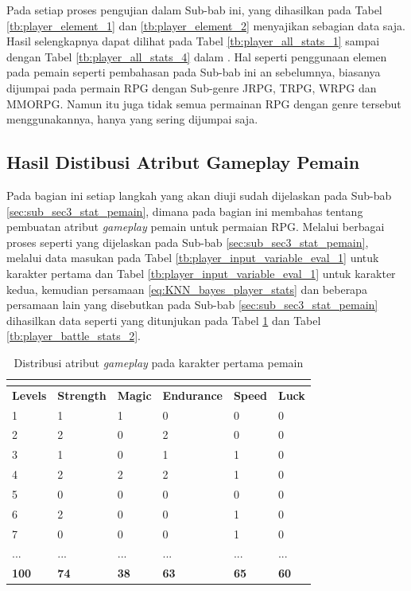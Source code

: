 Pada setiap proses pengujian dalam Sub-bab ini, yang dihasilkan pada Tabel \ref{tb:player_element_1} dan \ref{tb:player_element_2} menyajikan sebagian data saja. Hasil selengkapnya dapat dilihat pada Tabel \ref{tb:player_all_stats_1} sampai dengan Tabel \ref{tb:player_all_stats_4} dalam . Hal seperti penggunaan elemen pada pemain seperti pembahasan pada Sub-bab ini an sebelumnya, biasanya dijumpai pada permain RPG dengan Sub-genre JRPG, TRPG, WRPG dan MMORPG. Namun itu juga tidak semua permainan RPG dengan genre tersebut menggunakannya, hanya yang sering dijumpai saja.
\vspace{1ex}

\subsection{Hasil Distibusi Atribut Gameplay Pemain}
\label{sec:sub_sec4_eval_multi-character_stats}
\vspace{1ex}

Pada bagian ini setiap langkah yang akan diuji sudah dijelaskan pada Sub-bab \ref{sec:sub_sec3_stat_pemain}, dimana pada bagian ini membahas tentang pembuatan atribut \textit{gameplay} pemain untuk permaian RPG. Melalui berbagai proses seperti yang dijelaskan pada Sub-bab \ref{sec:sub_sec3_stat_pemain}, melalui data masukan pada Tabel \ref{tb:player_input_variable_eval_1} untuk karakter pertama dan Tabel \ref{tb:player_input_variable_eval_1} untuk karakter kedua, kemudian persamaan \ref{eq:KNN_bayes_player_stats} dan beberapa persamaan lain yang disebutkan pada Sub-bab \ref{sec:sub_sec3_stat_pemain} dihasilkan data seperti yang ditunjukan pada Tabel \ref{tb:player_battle_stats_1} dan Tabel \ref{tb:player_battle_stats_2}.
\vspace{-1ex}

\begin{longtable}{|l|l|l|l|l|l|}
	\caption{Distribusi atribut \textit{gameplay} pada karakter pertama pemain}
	\vspace{1ex}
	\label{tb:player_battle_stats_1}\\
	\hline
	\rowcolor[HTML]{C0C0C0} 
	\textbf{Levels} & \textbf{Strength} & \textbf{Magic} & \textbf{Endurance} & \textbf{Speed} & \textbf{Luck} \\ \hline
	1 & 1 & 1 & 0 & 0 & 0 \\ \hline
	2 & 2 & 0 & 2 & 0 & 0 \\ \hline
	3 & 1 & 0 & 1 & 1 & 0 \\ \hline
	4 & 2 & 2 & 2 & 1 & 0 \\ \hline
	5 & 0 & 0 & 0 & 0 & 0 \\ \hline
	6 & 2 & 0 & 0 & 1 & 0 \\ \hline
	7 & 0 & 0 & 0 & 1 & 0 \\ \hline
	... & ... & ... & ... & ... & ... \\ \hline
	\textbf{100} & \textbf{74} & \textbf{38} & \textbf{63} & \textbf{65} & \textbf{60} \\ \hline
\end{longtable}
\vspace{-1ex}

